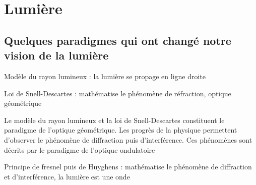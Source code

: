 \chapter{Lumière}

\section{Quelques paradigmes qui ont changé notre vision de la lumière}

\begin{center}
Modèle du rayon lumineux : la lumière se propage en ligne droite
\end{center}

\begin{center}
Loi de Snell-Descartes : mathématise le phénomène de réfraction, optique géométrique
\end{center}

Le modèle du rayon lumineux et la loi de Snell-Descartes constituent le paradigme de l'optique géométrique. Les progrès de la physique permettent d'observer le phénomène de diffraction puis d'interférence. Ces phénomènes sont décrits par le paradigme de l'optique ondulatoire

\begin{center}
Principe de fresnel puis de Huyghens : mathématise le phénomène de diffraction et d'interférence, la lumière est une onde
\end{center}





\subsection{}\subsection{}
\begin{center}
\end{center}

